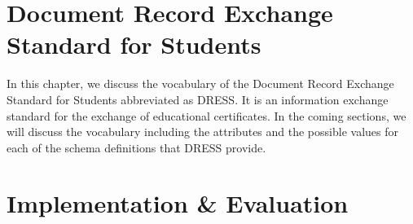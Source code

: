 \documentclass[12pt,a4paper,oneside]{book}
\begin{document}





\chapter{Document Record Exchange Standard for Students}\label{ch-DRESS}

In this chapter, we discuss the vocabulary of the Document Record Exchange Standard for Students abbreviated as DRESS. It is an information exchange standard for the exchange of educational certificates.  
In the coming sections, we will discuss the vocabulary including the attributes and the possible values for each of the schema definitions that DRESS provide.
  





\chapter{Implementation \& Evaluation}\label{ch-implement}
\end{document}
